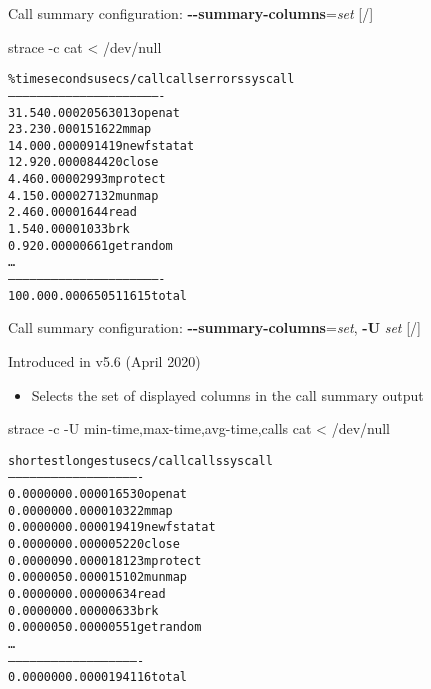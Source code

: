 \documentclass[unicode,aspectratio=169,xcolor={table,dvipsnames,usernames}]{beamer}
\begin{document}
\begin{frame}[fragile]{Call summary configuration: \textbf{-{}-summary-columns}=\textit{set} \hfill [\insertframenumber/\inserttotalframenumber]}
\begin{block}{strace -c cat < /dev/null}
\small
\begin{alltt}
\% time     seconds  usecs/call     calls    errors syscall
------ ----------- ----------- --------- --------- ----------------
 31.54    0.000205           6        30        13 openat
 23.23    0.000151           6        22           mmap
 14.00    0.000091           4        19           newfstatat
 12.92    0.000084           4        20           close
  4.46    0.000029           9         3           mprotect
  4.15    0.000027          13         2           munmap
  2.46    0.000016           4         4           read
  1.54    0.000010           3         3           brk
  0.92    0.000006           6         1           getrandom
\ldots
------ ----------- ----------- --------- --------- ----------------
100.00    0.000650           5       116        15 total
\end{alltt}
\end{block}
\end{frame}

\begin{frame}[fragile]{Call summary configuration: \textbf{-{}-summary-columns}=\textit{set}, \textbf{-U} \textit{set} \hfill [\insertframenumber/\inserttotalframenumber]}
\begin{block}{Introduced in v5.6 (April 2020)}
\begin{itemize}
\item Selects the set of displayed columns in the call summary output
\end{itemize}
\end{block}

\begin{block}{strace -c -U min-time,max-time,avg-time,calls cat < /dev/null}
\small
\begin{alltt}
shortest  longest  usecs/call     calls syscall
-------- -------- ----------- --------- ----------------
0.000000 0.000016           5        30 openat
0.000000 0.000010           3        22 mmap
0.000000 0.000019           4        19 newfstatat
0.000000 0.000005           2        20 close
0.000009 0.000018          12         3 mprotect
0.000005 0.000015          10         2 munmap
0.000000 0.000006           3         4 read
0.000000 0.000006           3         3 brk
0.000005 0.000005           5         1 getrandom
\ldots
-------- -------- ----------- --------- ----------------
0.000000 0.000019           4       116 total
\end{alltt}
\end{block}
\end{frame}
\end{document}

